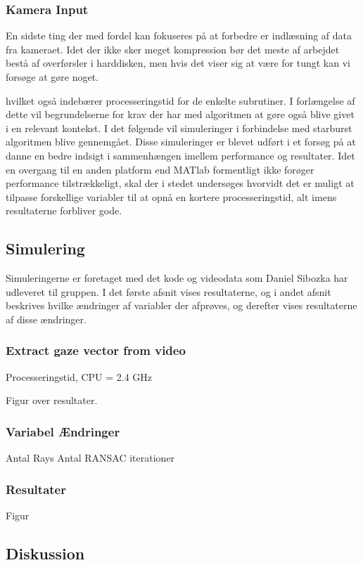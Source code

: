 \documentclass[a4paper,oneside,12pt]{article}
\begin{document}
	\subsubsection{Kamera Input}
	En sidste ting der med fordel kan fokuseres på at forbedre er indlæsning af data fra kameraet. Idet der ikke sker meget kompression bør det meste af arbejdet bestå af overførsler i harddisken, men hvis det viser sig at være for tungt kan vi forsøge at gøre noget.
	
	
	 hvilket også indebærer processeringstid for de enkelte subrutiner. I forlængelse af dette vil begrundelserne for krav der har med algoritmen at gøre også blive givet i en relevant kontekst.
	I det følgende vil simuleringer i forbindelse med starburst algoritmen blive gennemgået. Disse simuleringer er blevet udført i et forsøg på at danne en bedre indsigt i sammenhængen imellem performance og resultater. Idet en overgang til en anden platform end MATlab formentligt ikke forøger performance tilstrækkeligt, skal der i stedet undersøges hvorvidt det er muligt at tilpasse forskellige variabler til at opnå en kortere processeringstid, alt imens resultaterne forbliver gode.
	
	\subsection{Simulering}
	
	Simuleringerne er foretaget med det kode og videodata som Daniel Sibozka har udleveret til gruppen. I det første afsnit vises resultaterne, og i andet afsnit beskrives hvilke ændringer af variabler der afprøves, og derefter vises resultaterne af disse ændringer.
	
	\subsubsection{Extract gaze vector from video}
	
	Processeringstid, CPU = 2.4 GHz
	
	Figur over resultater.
	
	\subsubsection{Variabel Ændringer}
	
	Antal Rays
	Antal RANSAC iterationer
	
	
	\subsubsection{Resultater}
	
	Figur 
	\subsection{Diskussion}
		
\end{document}
